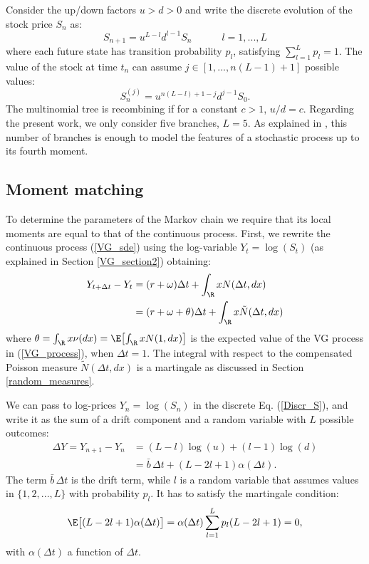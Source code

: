 Consider the up/down factors $u>d>0$ and write the discrete evolution of the stock price $S_n$ as:
\begin{equation}\label{Discr_S}
  S_{n+1} = u^{L-l}d^{l-1} S_n  \hspace{3em} l=1, ... , L  
\end{equation}
where each future state has transition probability $p_l$, satisfying $\sum_{l=1}^L p_l = 1$.
The value of the stock at time $t_n$ can assume $j \in [1,...,n(L-1)+1]$ possible values:
\begin{equation}\label{Discr_S2}
  S_{n}^{(j)} = u^{n(L-l)+1-j}d^{j-1} S_0.  
\end{equation}
The multinomial tree is recombining if for a constant $c>1$, $u/d = c$.
Regarding the present work, we only consider five branches, $L=5$. As explained in \cite{YaPr06}, this number of branches is 
enough to model the features of a stochastic process up to its fourth moment.


\subsection{Moment matching}

To determine the parameters of the Markov chain we require that its local moments are equal to that of the continuous process.
First, we rewrite the continuous process (\ref{VG_sde}) using the log-variable $Y_t = \log(S_t)$ (as explained in Section \ref{VG_section2}) 
obtaining:
\begin{align}\label{log_martingale}
 Y_{t+\Delta t}-Y_t &= (r+\omega)\Delta t + \int_{\R} x N(\Delta t,dx) \\ \nonumber
		    &= (r+\omega + \theta)\Delta t + \int_{\R} x \tilde N(\Delta t,dx)
\end{align}
where $\theta = \int_{\R} x \nu(dx) = \E \bigl[ \int_{\R} x N(1,dx) \bigr]$ is the expected value of the VG process in (\ref{VG_process}), 
when $\Delta t=1$. 
The integral with respect to the compensated Poisson measure $\tilde N(\Delta t,dx)$ is a martingale as discussed in Section \ref{random_measures}.

We can pass to log-prices $Y_n = \log(S_n)$ in the discrete Eq. (\ref{Discr_S}), and write it as the sum of a drift component and a 
random variable with $L$ possible outcomes:
\begin{align}\label{Discr_Y}
 \Delta Y = Y_{n+1} - Y_n &= (L-l) \log(u) + (l-1) \log(d) \\ \nonumber
  &= \bar b\, \Delta t + (L-2l+1) \alpha(\Delta t).
\end{align}
The term $\bar b\, \Delta t$ is the drift term, while $l$ is a random variable that assumes values in $\{1,2,...,L\}$ with probability $p_l$. 
It has to satisfy the martingale condition:
$$ \E \bigl[(L-2l+1) \alpha(\Delta t) \bigr] = \alpha(\Delta t) \sum_{l=1}^L p_l (L-2l+1) = 0, $$
with $\alpha(\Delta t)$ a function of $\Delta t$.

